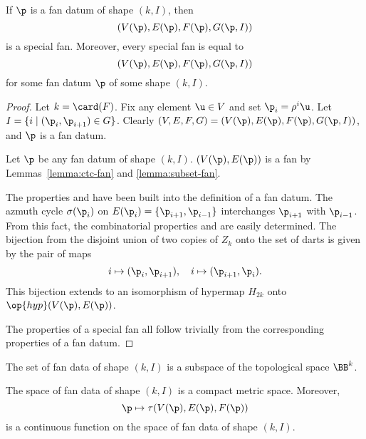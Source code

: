 \begin{lemma}
If $\p$ is a fan datum of shape $(k,I)$, then
\begin{displaymath}
(V(\p),E(\p),F(\p),G(\p,I))
\end{displaymath}
is a special fan.  Moreover, every special fan is equal to
\begin{displaymath}
(V(\p),E(\p),F(\p),G(\p,I))
\end{displaymath}
for some fan datum $\p$ of some shape $(k,I)$.
\end{lemma}

\begin{proof}
  Let $k=\card(F)$.  Fix any element $\u\in V$ and
set $\p_i = \rho^i \u$.  Let $I = \{i\mid (\p_i,\p_{i+1}) \in G\}$.
Clearly $(V,E,F,G)=(V(\p),E(\p),F(\p),G(\p,I))$, and $\p$ is a fan
datum.

Let $\p$ be any fan datum of shape $(k,I)$.
$(V(\p),E(\p))$
is a fan by Lemmas~\ref{lemma:ctc-fan} and \ref{lemma:subset-fan}.


 The properties
 and  have been built into the definition of a
fan datum.  The azmuth cycle $\sigma(\p_i)$ on $E(\p_i) =
\{\p_{i+1},\p_{i-1}\}$ interchanges $\p_{i+1}$ with $\p_{i-1}$.  From
this fact, the combinatorial properties  and  are easily determined.  The bijection from the disjoint
union of two copies of $Z_k$ onto the set of darts is given by the
pair of maps
\begin{displaymath}
i\mapsto (\p_i,\p_{i+1}),\quad i\mapsto (\p_{i+1},\p_i).
\end{displaymath}
This bijection extends to an isomorphism of hypermap $H_{2k}$ onto
$\op{hyp}(V(\p),E(\p))$.

 The properties
of a special fan all follow trivially from the corresponding
properties of a fan datum.
\end{proof}

The set of fan data of shape $(k,I)$ is a subspace of the topological
space $\BB^k$.


\begin{lemma}
The space of fan data of shape $(k,I)$ is a compact metric space.
Moreover,
\begin{displaymath}
\p \mapsto \tau(V(\p),E(\p),F(\p))
\end{displaymath}
is a continuous function on the space of fan data of shape $(k,I)$.
\end{lemma}

